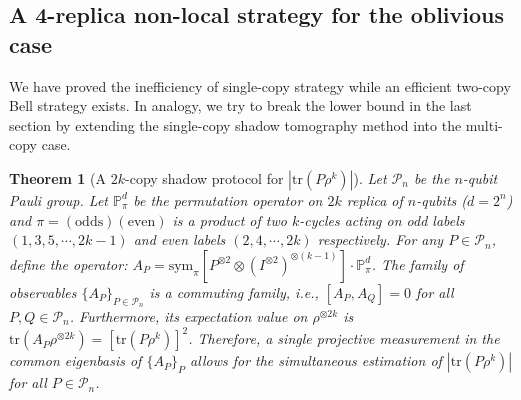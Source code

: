 \documentclass[aps,%
twocolumn,%
floatfix,%
pra,%
amsfonts,%
groupedaddress,%
superscriptaddress]{revtex4-2}%
\newtheorem{theorem}{Theorem}
\newcommand{\1}{\mathbbm{1}}
\begin{document}
\subsection{A 4-replica non-local strategy for the oblivious case}\label{app:UB_nonlin_P_shad}
We have proved the inefficiency of single-copy strategy while an efficient two-copy Bell strategy exists. 
In analogy, we try to break the lower bound in the last section by extending the single-copy shadow tomography method into the multi-copy case. 
\begin{theorem}[A $2k$-copy shadow protocol for $|\mathrm{tr}(P\rho^k)|$]
    Let $\mathcal{P}_n$ be the $n$-qubit Pauli group. Let $\mathbb{P}^{d}_{\pi}$ be the permutation operator on $2k$ replica of $n$-qubits ($d = 2^n$) and $\pi =(\mathrm{odds})(\mathrm{even})$ is a product of two $k$-cycles acting on odd labels $(1,3,5,\cdots,2k-1)$ and even labels $(2,4,\cdots,2k)$ respectively.
    For any $P \in \mathcal{P}_n$, define the operator: $ A_P =\mathrm{sym}_{\pi}\left[P^{\otimes 2} \otimes (I^{\otimes 2})^{\otimes (k-1)} \right] \cdot \mathbb{P}^{d}_{\pi}$.
    The family of observables $\{A_P\}_{P \in \mathcal{P}_n}$ is a commuting family, i.e., $[A_P, A_Q] = 0$ for all $P, Q \in \mathcal{P}_n$.
    Furthermore, its expectation value on $\rho^{\otimes 2k}$ is
    $\mathrm{tr}(A_P \rho^{\otimes 2k}) = [\mathrm{tr}(P\rho^k)]^2 $.
    Therefore, a single projective measurement in the common eigenbasis of $\{A_P\}_P$ allows for the simultaneous estimation of $|\mathrm{tr}(P\rho^k)|$ for all $P \in \mathcal{P}_n$.
\end{theorem}
\end{document}
